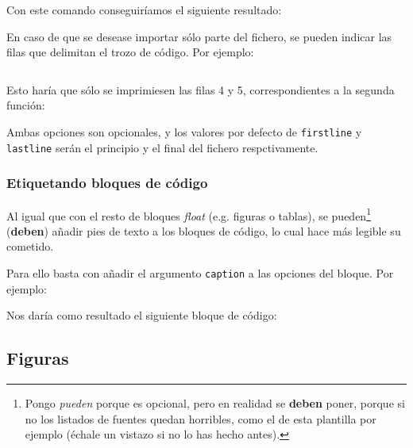 \documentclass[%
    school=etsisi,%
    type=tfg,%
    degree=61CD,%
]{upm-report}
\begin{document}
Con este comando conseguiríamos el siguiente resultado:



En caso de que se desease importar sólo parte del fichero, se pueden indicar las filas que delimitan el trozo de código. Por ejemplo:

\begin{lstlisting}[language=TeX]

\end{lstlisting}

Esto haría que sólo se imprimiesen las filas 4 y 5, correspondientes a la segunda función:



Ambas opciones son opcionales, y los valores por defecto de \texttt{firstline} y \texttt{lastline} serán el principio y el final del fichero respctivamente.

\subsubsection{Etiquetando bloques de código}

Al igual que con el resto de bloques \textit{float} (e.g. figuras o tablas), se pueden\footnote{Pongo \textit{pueden} porque es opcional, pero en realidad se \textbf{deben} poner, porque si no los listados de fuentes quedan horribles, como el de esta plantilla por ejemplo (échale un vistazo si no lo has hecho antes).} (\textbf{deben}) añadir pies de texto a los bloques de código, lo cual hace más legible su cometido.

Para ello basta con añadir el argumento \texttt{caption} a las opciones del bloque. Por ejemplo:



Nos daría como resultado el siguiente bloque de código:
 


\subsection{Figuras}
\label{ch:figuras}
\end{document}
